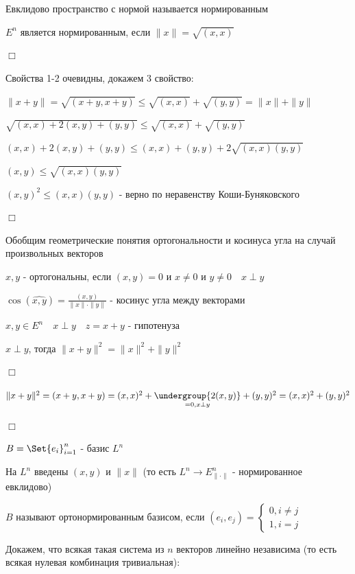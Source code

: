 \documentclass[12pt]{article}
\begin{document}
    \hypertarget{normalizedeuclidspace}{}

    Евклидово пространство с нормой называется нормированным

    \Th $E^n$ является нормированным, если $\|x\| = \sqrt{(x, x)}$

    $\Box$

    Свойства 1-2 очевидны, докажем 3 свойство:

    $\|x + y\| = \sqrt{(x + y, x + y)} \leq \sqrt{(x, x)} + \sqrt{(y, y)} = \|x\| + \|y\|$

    $\sqrt{(x, x) + 2(x, y) + (y, y)} \leq \sqrt{(x, x)} + \sqrt{(y, y)}$

    $(x, x) + 2(x, y) + (y, y) \leq (x, x) + (y, y) + 2\sqrt{(x, x)(y, y)}$

    $(x, y) \leq \sqrt{(x, x)(y, y)}$

    $(x, y)^2 \leq (x, x)(y, y)$ - верно по неравенству Коши-Буняковского

    $\Box$

    Обобщим геометрические понятия ортогональности и косинуса угла на случай произвольных векторов

    \Def $x, y$ - ортогональны, если $(x, y) = 0$ и $x \neq 0$ и $y \neq 0 \quad x \perp y$

    \Def $\cos(\widehat{x, y}) = \frac{(x, y)}{\|x\|\cdot\|y\|}$ - косинус угла между векторами

    \Def $x, y \in E^n \quad x \perp y \quad z = x + y$ - гипотенуза

    \Th $x \perp y$, тогда $\|x + y\|^2 = \|x\|^2 + \|y\|^2$

    $\Box$

    $\|x + y\|^2 = (x + y, x + y) = (x, x)^2 + \underset{= 0, x \perp y}{\undergroup{2(x, y)}} + (y, y)^2 = (x, x)^2 + (y, y)^2$

    $\Box$

    \Def $B = \Set{e_i}_{i=1}^n$ - базис $L^n$

    На $L^n$ введены $(x, y)$ и $\|x\|$ (то есть $L^n \to E^n_{\|\cdot\|}$ - нормированное евклидово)

    \hypertarget{ortonormalizedbasis}{}

    $B$ называют ортонормированным базисом, если $(e_i, e_j) = \begin{cases}0, i \neq j \\ 1, i = j\end{cases}$

    \Nota Докажем, что всякая такая система из $n$ векторов линейно независима (то есть всякая нулевая комбинация тривиальная):
\end{document}
